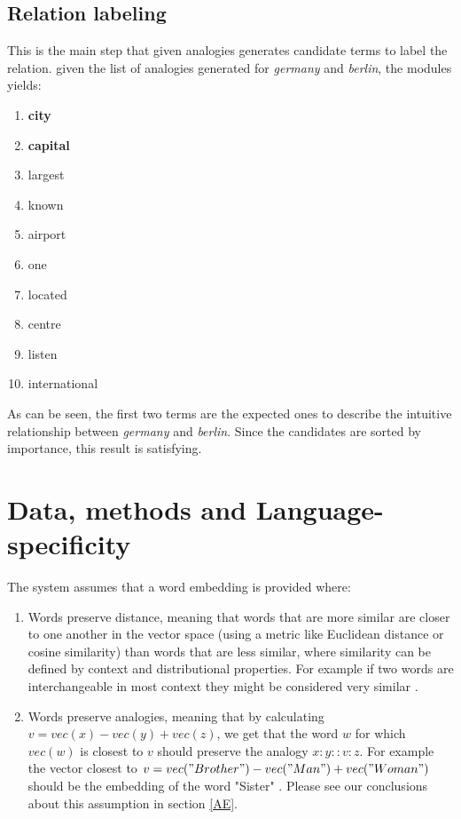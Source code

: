 \documentclass[11pt,a4paper]{article}
\begin{document}
\subsection{Relation labeling}
This is the main step that given analogies generates candidate terms to label the relation. given the list of analogies generated for \textit{germany} and \textit{berlin}, the modules yields:
\begin{enumerate}
\itemsep0em 
\item \textbf{city}
\item \textbf{capital}
\item largest
\item known
\item airport
\item one
\item located
\item centre
\item listen
\item international
\end{enumerate}
As can be seen, the first two terms are the expected ones to describe the intuitive relationship between \textit{germany} and \textit{berlin}. Since the candidates are sorted by importance, this result is satisfying.

\section{Data, methods and Language-specificity}
The system assumes that a word embedding is provided where:
\begin{enumerate}
\item Words preserve distance, meaning that words that are more similar are closer to one another in the vector space (using a metric like Euclidean distance or cosine similarity) 
than words that are less similar, where similarity can be defined by context and distributional properties. For example if two words are 
interchangeable in most context they might be considered very similar \cite{mikolov2013linguistic}.
\item Words preserve analogies, meaning that by calculating $v = vec(x) - vec(y) + vec(z)$, we get that the word $w$ for which $vec(w)$ is 
closest to $v$ should preserve the analogy $x:y::v:z$. For example the vector closest to $v = vec("Brother") - vec("Man") + vec("Woman")$ should be 
the embedding of the word "Sister" \cite{mikolov2013linguistic}. Please see our conclusions about this assumption in section \ref{AE}.
\end{enumerate}
\end{document}
